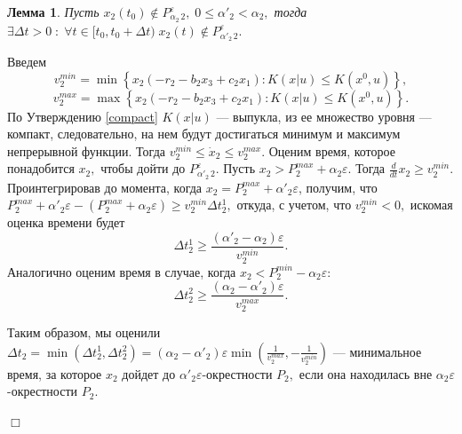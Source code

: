 \documentclass[11pt]{article}
\newtheorem{lemma}{Лемма}
\theoremstyle{definition}
\newenvironment{Proof}
{\par\noindent{\bf Доказательство.\\}} 
{\begin{flushright}$\Box$\end{flushright}}
\newcommand\Set[2]{\left\{ #1 \colon #2 \right\}}
\begin{document}
\begin{lemma}
\label{delta_t}
	Пусть $x_2(t_0) \not \in P_{\alpha_2 \,2}^{\varepsilon}, \; 0 \leqslant \alpha'_2 < \alpha_2,$ 
	тогда $\exists \Delta t > 0 \;:\; \forall t \in [t_0, t_0 + \Delta t) \; x_2(t) \not \in P_{\alpha'_2 \,2}^{\varepsilon}.$ 
\end{lemma}
\begin{Proof}
	Введем $$v_2^{min} = \min\Set{x_2(-r_2 - b_2x_3 + c_2x_1)}{K(x|u) \leqslant K(x^0,u)},$$
	$$v_2^{max} = \max\Set{x_2(-r_2 - b_2x_3 + c_2x_1)}{K(x|u) \leqslant K(x^0,u)}.$$ 
	По Утверждению \ref{compact} $K(x|u)$ --- выпукла, из \cite{Vasiliev} ее множество уровня --- компакт, следовательно, на нем будут достигаться минимум и максимум непрерывной функции. Тогда $v_2^{min} \leqslant \dot x_2 \leqslant v_2^{max}.$ Оценим время, которое понадобится $x_2,$ чтобы дойти до $P_{\alpha'_2\,2}^{\varepsilon}$.
	Пусть $x_2 > P_2^{max} + \alpha_2\varepsilon.$ Тогда $\frac{d}{dt}x_2 \geqslant v_2^{min}.$ Проинтегрировав до момента, когда $x_2 = P_2^{max} + \alpha'_2\varepsilon$, получим, что $P_2^{max} + \alpha'_2\varepsilon - (P_2^{max} + \alpha_2\varepsilon) \geqslant v_2^{min}\Delta t^1_2,$ откуда, с учетом, что $v_2^{min} < 0,$ искомая оценка времени будет $$\Delta t^1_2 \geqslant \frac{(\alpha'_2 - \alpha_2)\varepsilon}{v_2^{min}}.$$
	Аналогично оценим время в случае, когда $x_2 < P_2^{min} - \alpha_2\varepsilon:$
	$$\Delta t^2_2 \geqslant \frac{(\alpha_2 - \alpha'_2)\varepsilon}{v_2^{max}}.$$

	Таким образом, мы оценили $\Delta t_2 = \min(\Delta t^1_2, \Delta t^2_2) = (\alpha_2 - \alpha'_2)\varepsilon\min(\frac{1}{v_2^{max}}, -\frac{1}{v_2^{min}})$ --- минимальное время, за которое $x_2$ дойдет до $\alpha'_2\varepsilon$-окрестности $P_2,$ если она находилась вне $\alpha_2\varepsilon$-окрестности $P_2.$
\end{Proof}
\end{document}
